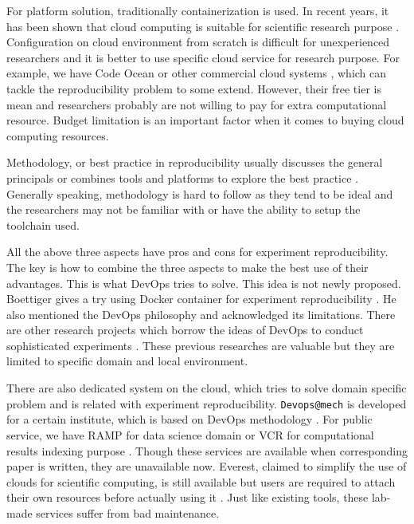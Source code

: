 \documentclass{IEEEcsmag}
\begin{document}
For platform solution, traditionally containerization is used. In recent years, it has been shown that cloud computing is suitable for scientific research purpose \cite{Howe12}. Configuration on cloud environment from scratch is difficult for unexperienced researchers and it is better to use specific cloud service for research purpose. For example, we have Code Ocean or other commercial cloud systems \cite{perkel2018data}, which can tackle the reproducibility problem to some extend. However, their free tier is mean and researchers probably are not willing to pay for extra computational resource. Budget limitation is an important factor when it comes to buying cloud computing resources.

Methodology, or best practice in reproducibility usually discusses the general principals \cite{stodden2014best} or combines tools and platforms to explore the best practice \cite{QashaCW16}. Generally speaking, methodology is hard to follow as they tend to be ideal and the researchers may not be familiar with or have the ability to setup the toolchain used.  

All the above three aspects have pros and cons for experiment reproducibility. The key is how to combine the three aspects to make the best use of their advantages. This is what DevOps tries to solve. This idea is not newly proposed. Boettiger gives a try using Docker container for experiment reproducibility \cite{Boettiger15}.
He also mentioned the DevOps philosophy and acknowledged its limitations.
There are other research projects which borrow the ideas of DevOps to conduct sophisticated experiments \cite{chwalisz2019walker}. These previous researches are valuable but they are limited to specific domain and local environment. 

There are also dedicated system on the cloud, which tries to solve domain specific problem and is related with experiment reproducibility. \texttt{Devops@mech} is developed for a certain institute, which is based on DevOps methodology \cite{philips2019devops}. For public service, we have    RAMP for data science domain \cite{kegl2018ramp} or VCR for computational results indexing purpose \cite{GavishD12}. Though these services are available when corresponding paper is written, they are unavailable now.
Everest, claimed to simplify the use of clouds for scientific computing, is still available but users are required to attach their own resources before actually using it \cite{VOLKOV2017112}.
Just like existing tools, these lab-made services suffer from bad maintenance.
\end{document}
